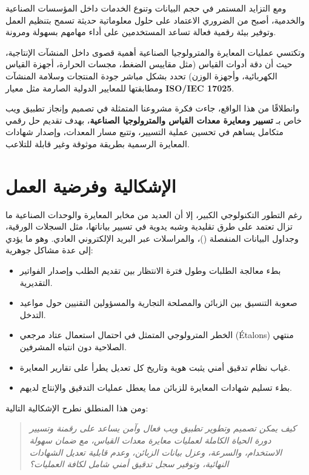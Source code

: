 \documentclass{bts-report-ar}
\begin{document}
ومع التزايد المستمر في حجم البيانات وتنوع الخدمات داخل المؤسسات الصناعية والخدمية، أصبح من الضروري الاعتماد على حلول معلوماتية حديثة تسمح بتنظيم العمل وتوفير بيئة رقمية فعالة تساعد المستخدمين على أداء مهامهم بسهولة ومرونة.

وتكتسي عمليات المعايرة والمترولوجيا الصناعية أهمية قصوى داخل المنشآت الإنتاجية، حيث أن دقة أدوات القياس (مثل مقاييس الضغط، مجسات الحرارة، أجهزة القياس الكهربائية، وأجهزة الوزن) تحدد بشكل مباشر جودة المنتجات وسلامة المنشآت ومطابقتها للمعايير الدولية الصارمة مثل معيار \textbf{ISO/IEC 17025}. 

وانطلاقًا من هذا الواقع، جاءت فكرة مشروعنا المتمثلة في تصميم وإنجاز تطبيق ويب خاص بـ \textbf{تسيير ومعايرة معدات القياس والمترولوجيا الصناعية}، بهدف تقديم حل رقمي متكامل يساهم في تحسين عملية التسيير، وتتبع مسار المعدات، وإصدار شهادات المعايرة الرسمية بطريقة موثوقة وغير قابلة للتلاعب.

\section*{الإشكالية وفرضية العمل}
رغم التطور التكنولوجي الكبير، إلا أن العديد من مخابر المعايرة والوحدات الصناعية ما تزال تعتمد على طرق تقليدية وشبه يدوية في تسيير بياناتها، مثل السجلات الورقية، وجداول البيانات المنفصلة ()، والمراسلات عبر البريد الإلكتروني العادي. وهو ما يؤدي إلى عدة مشاكل جوهرية:
\begin{itemize}
  \item بطء معالجة الطلبات وطول فترة الانتظار بين تقديم الطلب وإصدار الفواتير التقديرية.
  \item صعوبة التنسيق بين الزبائن والمصلحة التجارية والمسؤولين التقنيين حول مواعيد التدخل.
  \item الخطر المترولوجي المتمثل في احتمال استعمال عتاد مرجعي (Étalons) منتهي الصلاحية دون انتباه المشرفين.
  \item غياب نظام تدقيق أمني يثبت هوية وتاريخ كل تعديل يطرأ على تقارير المعايرة.
  \item بطء تسليم شهادات المعايرة للزبائن مما يعطل عمليات التدقيق والإنتاج لديهم.
\end{itemize}

ومن هذا المنطلق نطرح الإشكالية التالية:
\begin{quote}
\itshape
\og كيف يمكن تصميم وتطوير تطبيق ويب فعال وآمن يساعد على رقمنة وتسيير دورة الحياة الكاملة لعمليات معايرة معدات القياس، مع ضمان سهولة الاستخدام، والسرعة، وعزل بيانات الزبائن، وعدم قابلية تعديل الشهادات النهائية، وتوفير سجل تدقيق أمني شامل لكافة العمليات؟ \fg
\end{quote}
\end{document}
